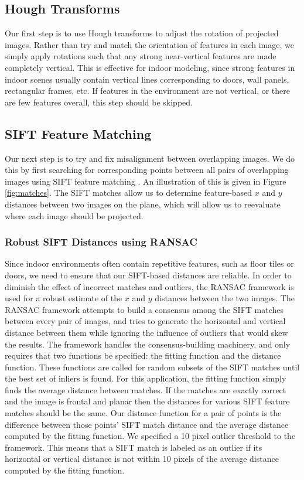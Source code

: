 \documentclass[10pt,twocolumn,letterpaper]{article}
\begin{document}
\subsection{Hough Transforms}
Our first step is to use Hough transforms to adjust the rotation of
projected images. Rather than try and match the orientation of
features in each image, we simply apply rotations such that any strong
near-vertical features are made completely vertical. This is effective
for indoor modeling, since strong features in indoor scenes usually
contain vertical lines corresponding to doors, wall panels,
rectangular frames, etc. If features in the environment are not
vertical, or there are few features overall, this step should be
skipped.


\subsection{SIFT Feature Matching}
Our next step is to try and fix misalignment between overlapping
images. We do this by first searching for corresponding points between
all pairs of overlapping images using SIFT feature matching
\cite{lowe1999object}. An illustration of this is given in Figure
\ref{fig:matches}. The SIFT matches allow us to determine
feature-based $x$ and $y$ distances between two images on the plane,
which will allow us to reevaluate where each image should be projected.

\subsubsection{Robust SIFT Distances using RANSAC}
Since indoor environments often contain repetitive features, such as floor tiles or doors, we need to ensure that our SIFT-based distances are
reliable. In order to diminish the effect of incorrect matches and outliers, the RANSAC
framework \cite{fischler1981random} is used for a robust estimate of
the $x$ and $y$ distances between the two images. The RANSAC framework
attempts to build a consensus among the SIFT matches between every pair of images, and tries to generate the horizontal and vertical distance between them while ignoring
the influence of outliers that would skew the results. The framework
handles the consensus-building machinery, and only requires that two
functions be specified: the fitting function and the distance
function. These functions are called for random subsets of the SIFT
matches until the best set of inliers is found. For this application,
the fitting function simply finds the average distance between
matches. If the matches are exactly correct and the image is frontal
and planar then the distances for various SIFT feature matches should
be the same. Our distance function for a pair of points is the
difference between those points' SIFT match distance and the average
distance computed by the fitting function. We specified a 10 pixel
outlier threshold to the framework. This means that a SIFT match is
labeled as an outlier if its horizontal or vertical distance is not within 10
pixels of the average distance computed by the fitting function.
\end{document}
